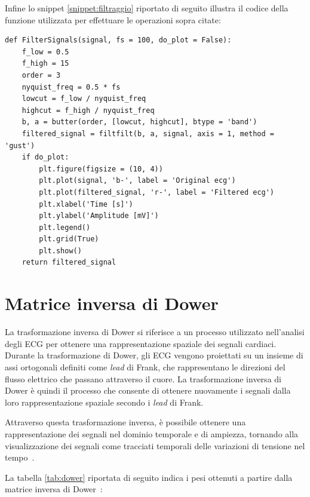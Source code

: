 \documentclass[12pt,italian]{report}
\begin{document}
Infine lo snippet \ref{snippet:filtraggio} riportato di seguito illustra il codice della funzione utilizzata per effettuare le operazioni sopra citate:

\lstset{language=Python}
\begin{lstlisting}[aboveskip=15pt, belowskip=15pt, basicstyle=\fontsize{8}{10}\selectfont, keywordstyle=\color{blue}, breaklines=true, label=snippet:filtraggio]
def FilterSignals(signal, fs = 100, do_plot = False):
    f_low = 0.5
    f_high = 15
    order = 3
    nyquist_freq = 0.5 * fs
    lowcut = f_low / nyquist_freq
    highcut = f_high / nyquist_freq
    b, a = butter(order, [lowcut, highcut], btype = 'band')
    filtered_signal = filtfilt(b, a, signal, axis = 1, method = 'gust')
    if do_plot:
        plt.figure(figsize = (10, 4))
        plt.plot(signal, 'b-', label = 'Original ecg')
        plt.plot(filtered_signal, 'r-', label = 'Filtered ecg')
        plt.xlabel('Time [s]')
        plt.ylabel('Amplitude [mV]')
        plt.legend()
        plt.grid(True)
        plt.show()
    return filtered_signal
\end{lstlisting}

\section{Matrice inversa di Dower}
\label{sec:matrice}

La trasformazione inversa di Dower si riferisce a un processo utilizzato nell'analisi degli ECG per ottenere una rappresentazione spaziale dei segnali cardiaci. Durante la trasformazione di Dower, gli ECG vengono proiettati su un insieme di assi ortogonali definiti come \textit{lead} di Frank, che rappresentano le direzioni del flusso elettrico che passano attraverso il cuore. La trasformazione inversa di Dower è quindi il processo che consente di ottenere nuovamente i segnali dalla loro rappresentazione spaziale secondo i \textit{lead} di Frank.

Attraverso questa trasformazione inversa, è possibile ottenere una rappresentazione dei segnali nel dominio temporale e di ampiezza, tornando alla visualizzazione dei segnali come tracciati temporali delle variazioni di tensione nel tempo~\cite{dower}.

La tabella \ref{tab:dower} riportata di seguito indica i pesi ottenuti a partire dalla matrice inversa di Dower~\cite{dowerecg}:
\end{document}
